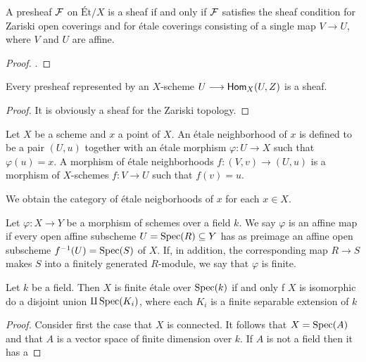 \begin{theorem}
  A presheaf $\mathcal{F}$ on $\text{\'Et}/X$ is a sheaf if and only if $\mathcal{F}$ satisfies the sheaf condition for Zariski open coverings and for \'etale coverings consisting of a single map $V \to U$, where $V$ and $U$ are affine.
\end{theorem}
\begin{proof}
  \cite{milneLEC}.
\end{proof}
\begin{corollary}
  Every presheaf represented by an $X$-scheme $U \longrightarrow \mathsf{Hom}_X(U,Z)$ is a sheaf. 
\end{corollary}
\begin{proof}
  It is obviously a sheaf for the Zariski topology. 
\end{proof}

\begin{definition}
  Let $X$ be a scheme and $x$ a point of $X$. An \'etale neighborhood of $x$ is defined to be a pair $(U, u)$ together with an \'etale morphism $\varphi: U \to X$ such that $\varphi(u) = x$. A morphism of \'etale neighborhoods $f: (V,v) \to (U,u)$ is a morphism of $X$-schemes $f: V \to U$ such that $f(v) = u$.
\end{definition}
We obtain the category of \'etale neigborhoods of $x$ for each $x \in X$.

\begin{definition}
  Let $\varphi: X \to Y$ be a morphism of schemes over a field $k$. We say $\varphi$ is an affine map if every open affine subscheme $U = \operatorname{Spec}(R) \subseteq Y$ has as preimage an affine open subscheme $f^{-1}(U) = \operatorname{Spec}(S)$ of $X$. If, in addition, the corresponding map $R \to S$ makes $S$ into a finitely generated $R$-module, we say that $\varphi$ is finite.
\end{definition}

\begin{proposition}
Let $k$ be a field. Then $X$ is finite \'etale over $\operatorname{Spec}(k)$ if and only f $X$ is isomorphic do a disjoint union $\amalg \operatorname{Spec}(K_i)$, where each $K_i$ is a finite separable extension of $k$
\end{proposition}
\begin{proof}
  Consider first the case that $X$ is connected. It follows that $X = \operatorname{Spec}(A)$ and that $A$ is a vector space of finite dimension over $k$. If $A$ is not a field then it has a
\end{proof}

